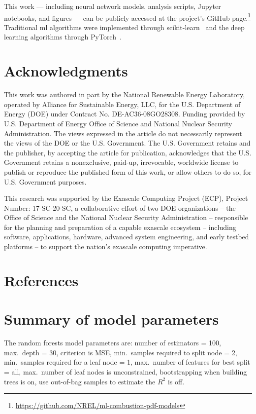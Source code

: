 \documentclass[review]{elsarticle}
\begin{document}
This work --- including neural network models, analysis scripts, Jupyter
notebooks, and figures --- can be publicly accessed at the project's
GitHub
page.\footnote{\url{https://github.com/NREL/ml-combustion-pdf-models}}
Traditional \gls{ml} algorithms were implemented through
scikit-learn~\cite{Pedregosa2011} and the deep learning algorithms
through PyTorch~\cite{Paszke2017}.

\section*{Acknowledgments}
This work was authored in part by the National Renewable Energy Laboratory, operated by Alliance for Sustainable Energy, LLC, for the U.S. Department of Energy (DOE) under Contract No. DE-AC36-08GO28308. Funding provided by U.S. Department of Energy Office of Science and National Nuclear Security Administration. The views expressed in the article do not necessarily represent the views of the DOE or the U.S. Government. The U.S. Government retains and the publisher, by accepting the article for publication, acknowledges that the U.S. Government retains a nonexclusive, paid-up, irrevocable, worldwide license to publish or reproduce the published form of this work, or allow others to do so, for U.S. Government purposes.

This research was supported by the Exascale Computing Project (ECP), Project Number: 17-SC-20-SC, a collaborative effort of two DOE organizations -- the Office of Science and the National Nuclear Security Administration -- responsible for the planning and preparation of a capable exascale ecosystem -- including software, applications, hardware, advanced system engineering, and early testbed platforms -- to support the nation's exascale computing imperative.

\section*{References}



\appendix
\section{Summary of model parameters}\label{app:hp_summary}
The random forests model parameters are: number of estimators = 100,
max.\ depth = 30, criterion is MSE, min.\ samples required to split
node = 2, min.\ samples required for a leaf node = 1, max.\ number of
features for best split = all, max.\ number of leaf nodes is
unconstrained, bootstrapping when building trees is on, use out-of-bag
samples to estimate the $R^2$ is off.
\end{document}
